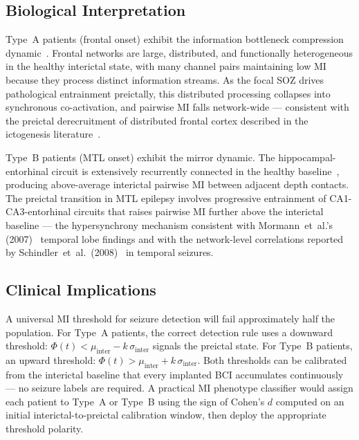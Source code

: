 \documentclass[final,5p,times,twocolumn]{elsarticle}
\begin{document}
\subsection{Biological Interpretation}

Type~A patients (frontal onset) exhibit the information bottleneck
compression dynamic~\cite{tishby2000}.
%
Frontal networks are large, distributed, and functionally heterogeneous
in the healthy interictal state, with many channel pairs maintaining low
MI because they process distinct information streams.
%
As the focal SOZ drives pathological entrainment preictally, this
distributed processing collapses into synchronous co-activation, and
pairwise MI falls network-wide --- consistent with the
preictal derecruitment of distributed frontal cortex described in the
ictogenesis literature~\cite{trevelyan2013}.

Type~B patients (MTL onset) exhibit the mirror dynamic.
%
The hippocampal-entorhinal circuit is extensively recurrently connected
in the healthy baseline~\cite{witter2002}, producing above-average
interictal pairwise MI between adjacent depth contacts.
%
The preictal transition in MTL epilepsy involves progressive entrainment
of CA1-CA3-entorhinal circuits that raises pairwise MI further above the
interictal baseline --- the hypersynchrony mechanism consistent with
Mormann~et~al.'s (2007)~\cite{mormann2007} temporal lobe findings and
with the network-level correlations reported by
Schindler~et~al.\ (2008)~\cite{schindler2008} in temporal seizures.

\subsection{Clinical Implications}

A universal MI threshold for seizure detection will fail approximately
half the population.
%
For Type~A patients, the correct detection rule uses a downward
threshold: $\Phi(t) < \mu_{\text{inter}} - k\,\sigma_{\text{inter}}$
signals the preictal state.
%
For Type~B patients, an upward threshold:
$\Phi(t) > \mu_{\text{inter}} + k\,\sigma_{\text{inter}}$.
%
Both thresholds can be calibrated from the interictal baseline that
every implanted BCI accumulates continuously --- no seizure labels are
required.
%
A practical MI phenotype classifier would assign each patient to Type~A
or Type~B using the sign of Cohen's $d$ computed on an initial
interictal-to-preictal calibration window, then deploy the appropriate
threshold polarity.
\end{document}
